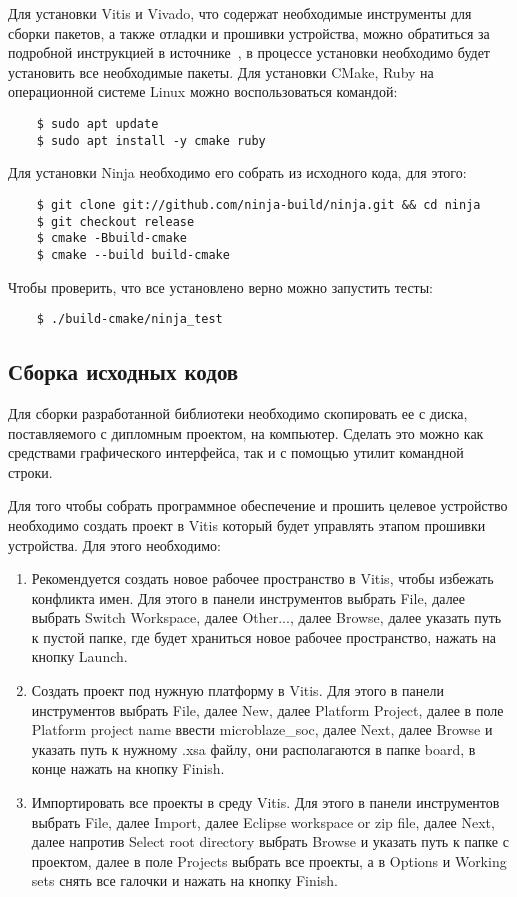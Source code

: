 Для установки Vitis и Vivado, что содержат необходимые инструменты для сборки пакетов, а также отладки и прошивки устройства, можно
обратиться за подробной инструкцией в источнике~\cite{install_vitis, install_vivado}, в процессе установки необходимо будет установить
все необходимые пакеты. Для установки CMake, Ruby на операционной системе Linux можно воспользоваться командой:
\begin{lstlisting}
    $ sudo apt update
    $ sudo apt install -y cmake ruby
\end{lstlisting}

Для установки Ninja необходимо его собрать из исходного кода, для этого:
\begin{lstlisting}
    $ git clone git://github.com/ninja-build/ninja.git && cd ninja
    $ git checkout release
    $ cmake -Bbuild-cmake
    $ cmake --build build-cmake
\end{lstlisting}

Чтобы проверить, что все установлено верно можно запустить тесты: 
\begin{lstlisting}
    $ ./build-cmake/ninja_test
\end{lstlisting}

\subsection{Сборка исходных кодов}

Для сборки разработанной библиотеки необходимо скопировать ее с диска, поставляемого
с дипломным проектом, на компьютер. Сделать это можно как средствами
графического интерфейса, так и с помощью утилит командной строки.

Для того чтобы собрать программное обеспечение и прошить целевое устройство необходимо создать проект в Vitis который будет управлять этапом прошивки устройства. Для
этого необходимо:

\begin{enumerate}
    \item Рекомендуется создать новое рабочее пространство в Vitis, чтобы избежать конфликта имен. 
    Для этого в панели инструментов выбрать File, далее выбрать Switch Workspace, далее Other..., 
    далее Browse, далее указать путь к пустой папке, где будет храниться новое рабочее пространство, нажать на кнопку Launch.
    \item Создать проект под нужную платформу в Vitis. Для этого в панели инструментов выбрать File, далее New, далее Platform Project, далее в 
    поле Platform project name ввести microblaze\_soc, далее Next, далее Browse и указать путь к нужному .xsa файлу, 
    они располагаются в папке board, в конце нажать на кнопку Finish.
    \item Импортировать все проекты в среду Vitis. Для этого в панели инструментов выбрать File, далее Import, далее Eclipse workspace or zip file, далее Next, далее
    напротив Select root directory выбрать Browse и указать путь к  папке с проектом, далее в поле Projects выбрать все проекты, а в Options 
    и Working sets снять все галочки и нажать на кнопку Finish.
\end{enumerate}

